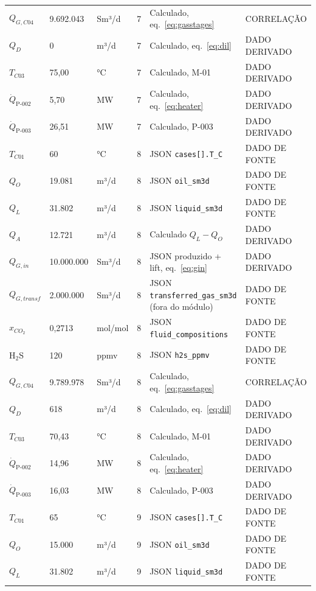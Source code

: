 \documentclass[11pt,a4paper]{article}
\numberwithin{equation}{section}
\numberwithin{table}{section}
\numberwithin{figure}{section}
\newcommand{\tipo}[1]{\textsf{\footnotesize #1}}
\begin{document}
{\begin{longtable}{L{3.6cm}L{2.2cm}lL{1.0cm}L{4.2cm}l}
$Q_{G,C04}$ & 9.692.043 & Sm³/d & 7 & Calculado, eq.~\eqref{eq:gasstages} & \tipo{CORRELAÇÃO}\\
$Q_{D}$ & 0 & m³/d & 7 & Calculado, eq.~\eqref{eq:dil} & \tipo{DADO DERIVADO}\\
$T_{C03}$ & 75,00 & °C & 7 & Calculado, M-01 & \tipo{DADO DERIVADO}\\
$\dot Q_{\mbox{P-002}}$ & 5,70 & MW & 7 & Calculado, eq.~\eqref{eq:heater} & \tipo{DADO DERIVADO}\\
$\dot Q_{\mbox{P-003}}$ & 26,51 & MW & 7 & Calculado, P-003 & \tipo{DADO DERIVADO}\\
$T_{C01}$ & 60 & °C & 8 & JSON \texttt{cases[].T\_C} & \tipo{DADO DE FONTE}\\
$Q_{O}$ & 19.081 & m³/d & 8 & JSON \texttt{oil\_sm3d} & \tipo{DADO DE FONTE}\\
$Q_{L}$ & 31.802 & m³/d & 8 & JSON \texttt{liquid\_sm3d} & \tipo{DADO DE FONTE}\\
$Q_{A}$ & 12.721 & m³/d & 8 & Calculado $Q_L-Q_O$ & \tipo{DADO DERIVADO}\\
$Q_{G,in}$ & 10.000.000 & Sm³/d & 8 & JSON produzido + lift, eq.~\eqref{eq:gin} & \tipo{DADO DERIVADO}\\
$Q_{G,transf}$ & 2.000.000 & Sm³/d & 8 & JSON \texttt{transferred\_gas\_sm3d} (fora do módulo) & \tipo{DADO DE FONTE}\\
$x_{CO_2}$ & 0{,}2713 & mol/mol & 8 & JSON \texttt{fluid\_compositions} & \tipo{DADO DE FONTE}\\
H$_2$S & 120 & ppmv & 8 & JSON \texttt{h2s\_ppmv} & \tipo{DADO DE FONTE}\\
$Q_{G,C04}$ & 9.789.978 & Sm³/d & 8 & Calculado, eq.~\eqref{eq:gasstages} & \tipo{CORRELAÇÃO}\\
$Q_{D}$ & 618 & m³/d & 8 & Calculado, eq.~\eqref{eq:dil} & \tipo{DADO DERIVADO}\\
$T_{C03}$ & 70,43 & °C & 8 & Calculado, M-01 & \tipo{DADO DERIVADO}\\
$\dot Q_{\mbox{P-002}}$ & 14,96 & MW & 8 & Calculado, eq.~\eqref{eq:heater} & \tipo{DADO DERIVADO}\\
$\dot Q_{\mbox{P-003}}$ & 16,03 & MW & 8 & Calculado, P-003 & \tipo{DADO DERIVADO}\\
$T_{C01}$ & 65 & °C & 9 & JSON \texttt{cases[].T\_C} & \tipo{DADO DE FONTE}\\
$Q_{O}$ & 15.000 & m³/d & 9 & JSON \texttt{oil\_sm3d} & \tipo{DADO DE FONTE}\\
$Q_{L}$ & 31.802 & m³/d & 9 & JSON \texttt{liquid\_sm3d} & \tipo{DADO DE FONTE}\\

\end{longtable}}
\end{document}

